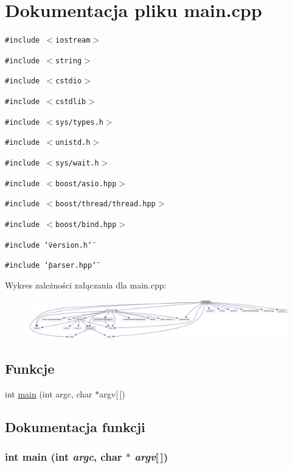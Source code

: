 \hypertarget{a00009}{
\section{Dokumentacja pliku main.cpp}
\label{da/da0/a00009}
}
{\tt \#include $<$iostream$>$}\par
{\tt \#include $<$string$>$}\par
{\tt \#include $<$cstdio$>$}\par
{\tt \#include $<$cstdlib$>$}\par
{\tt \#include $<$sys/types.h$>$}\par
{\tt \#include $<$unistd.h$>$}\par
{\tt \#include $<$sys/wait.h$>$}\par
{\tt \#include $<$boost/asio.hpp$>$}\par
{\tt \#include $<$boost/thread/thread.hpp$>$}\par
{\tt \#include $<$boost/bind.hpp$>$}\par
{\tt \#include \char`\"{}version.h\char`\"{}}\par
{\tt \#include \char`\"{}parser.hpp\char`\"{}}\par


Wykres zależności załączania dla main.cpp:\nopagebreak
\begin{figure}[H]
\begin{center}
\leavevmode
\includegraphics[width=420pt]{d3/de7/a00039}
\end{center}
\end{figure}
\subsection*{Funkcje}
\begin{CompactItemize}
\item 
int \hyperlink{a00009_0ddf1224851353fc92bfbff6f499fa97}{main} (int argc, char $\ast$argv\mbox{[}$\,$\mbox{]})
\end{CompactItemize}


\subsection{Dokumentacja funkcji}
\hypertarget{a00009_0ddf1224851353fc92bfbff6f499fa97}{
\subsubsection[{main}]{\setlength{\rightskip}{0pt plus 5cm}int main (int {\em argc}, \/  char $\ast$ {\em argv}\mbox{[}$\,$\mbox{]})}}
\label{da/da0/a00009_0ddf1224851353fc92bfbff6f499fa97}




